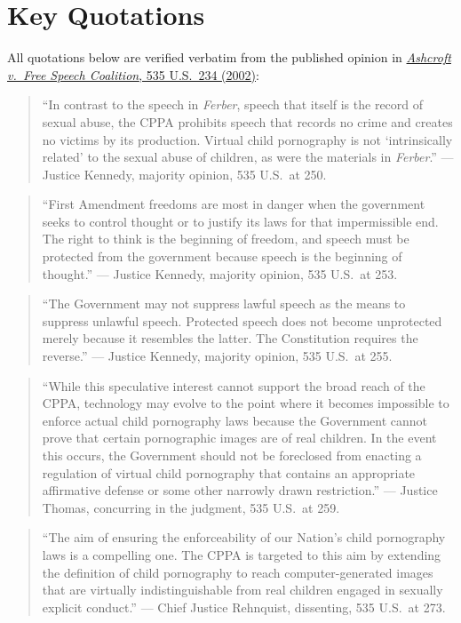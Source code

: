 \documentclass[12pt]{article}
\begin{document}
\section{Key Quotations}

All quotations below are verified verbatim from the published opinion in \href{https://supreme.justia.com/cases/federal/us/535/234/}{\textit{Ashcroft v.\ Free Speech Coalition}, 535 U.S.\ 234 (2002)}:

\begin{quote}
``In contrast to the speech in \textit{Ferber}, speech that itself is the record of sexual abuse, the CPPA prohibits speech that records no crime and creates no victims by its production. Virtual child pornography is not `intrinsically related' to the sexual abuse of children, as were the materials in \textit{Ferber}.'' --- Justice Kennedy, majority opinion, 535 U.S.\ at 250.
\end{quote}

\begin{quote}
``First Amendment freedoms are most in danger when the government seeks to control thought or to justify its laws for that impermissible end. The right to think is the beginning of freedom, and speech must be protected from the government because speech is the beginning of thought.'' --- Justice Kennedy, majority opinion, 535 U.S.\ at 253.
\end{quote}

\begin{quote}
``The Government may not suppress lawful speech as the means to suppress unlawful speech. Protected speech does not become unprotected merely because it resembles the latter. The Constitution requires the reverse.'' --- Justice Kennedy, majority opinion, 535 U.S.\ at 255.
\end{quote}

\begin{quote}
``While this speculative interest cannot support the broad reach of the CPPA, technology may evolve to the point where it becomes impossible to enforce actual child pornography laws because the Government cannot prove that certain pornographic images are of real children. In the event this occurs, the Government should not be foreclosed from enacting a regulation of virtual child pornography that contains an appropriate affirmative defense or some other narrowly drawn restriction.'' --- Justice Thomas, concurring in the judgment, 535 U.S.\ at 259.
\end{quote}

\begin{quote}
``The aim of ensuring the enforceability of our Nation's child pornography laws is a compelling one. The CPPA is targeted to this aim by extending the definition of child pornography to reach computer-generated images that are virtually indistinguishable from real children engaged in sexually explicit conduct.'' --- Chief Justice Rehnquist, dissenting, 535 U.S.\ at 273.
\end{quote}
\end{document}
